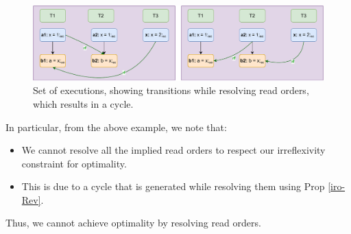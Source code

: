         \begin{figure}
            \centering
            \includegraphics{Equivalence_Example.pdf}
            \caption{Set of executions, showing transitions while resolving read orders, which results in a cycle.}
            \label{iro:counter_example}
        \end{figure}

        In particular, from the above example, we note that:
        \begin{itemize}
            \item We cannot resolve all the implied read orders to respect our irreflexivity constraint for optimality.
            \item This is due to a cycle that is generated while resolving them using Prop \ref{iro-Rev}.
        \end{itemize}

        Thus, we cannot achieve optimality by resolving read orders. 

     
